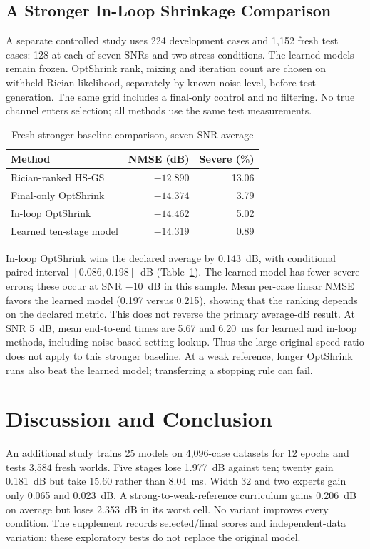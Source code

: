 \documentclass[journal]{IEEEtran}
\begin{document}
\subsection{A Stronger In-Loop Shrinkage Comparison}
A separate controlled study uses 224 development cases and 1,152 fresh
test cases: 128 at each of seven SNRs and two stress conditions. The learned
models remain frozen. OptShrink rank, mixing and iteration count are chosen
on withheld Rician likelihood, separately by known noise level, before test
generation. The same grid includes a final-only control and no filtering.
No true channel enters selection; all methods use the same test measurements.

\begin{table}[!t]
\caption{Fresh stronger-baseline comparison, seven-SNR average}
\label{tab:strong}\centering\small
\begin{tabular}{@{}lrr@{}}\toprule
Method & NMSE (dB) & Severe (\%)\\\midrule
Rician-ranked HS-GS & $-12.890$ & 13.06\\
Final-only OptShrink & $-14.374$ & 3.79\\
In-loop OptShrink & $-14.462$ & 5.02\\
Learned ten-stage model & $-14.319$ & 0.89\\\bottomrule
\end{tabular}
\end{table}

In-loop OptShrink wins the declared average by 0.143~dB, with conditional
paired interval $[0.086,0.198]$~dB (Table~\ref{tab:strong}). The learned model
has fewer severe errors; these occur at SNR $-10$~dB in this sample.
Mean per-case linear NMSE favors the learned model (0.197 versus 0.215),
showing that the ranking depends on the declared metric. This does not
reverse the primary average-dB result. At SNR 5~dB, mean end-to-end times
are 5.67 and 6.20~ms for learned and in-loop methods, including noise-based
setting lookup. Thus the large original speed ratio does not apply to
this stronger baseline. At a weak reference, longer OptShrink runs also
beat the learned model; transferring a stopping rule can fail.

\section{Discussion and Conclusion}
An additional study trains 25 models on 4,096-case datasets for 12 epochs
and tests 3,584 fresh worlds. Five stages lose 1.977~dB against ten;
twenty gain 0.181~dB but take 15.60 rather than 8.04~ms. Width 32 and
two experts gain only 0.065 and 0.023~dB. A strong-to-weak-reference
curriculum gains 0.206~dB on average but loses 2.353~dB in its worst cell.
No variant improves every condition. The supplement records selected/final
scores and independent-data variation; these exploratory tests do not
replace the original model.
\end{document}
